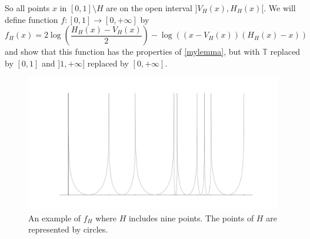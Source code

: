 \documentclass[a4paper,12pt,twoside,BCOR=10mm]{scrbook}
\theoremstyle{definition}
\theoremstyle{definition}
\theoremstyle{definition}
\begin{document}
So all points $x$ in $[0, 1] \setminus H$ are on the open interval $]V_H(x), H_H(x)[$.
We will define function $f: [0, 1] \rightarrow [0, +\infty]$ by
\[
\label{index29}
	f_H(x) = 2\log \left ( \frac{H_H(x) - V_H(x)}{2} \right ) - \log((x - V_H(x))(H_H(x) - x))
\]
and show that this function has the properties of \ref{mylemma}, but with $\mathbb{T}$ replaced by $[0, 1]$ and $]1, +\infty]$ replaced by $[0, +\infty]$.
\begin{figure}[h]
\centering
\includegraphics[width=1\textwidth]{graph8}
\caption{An example of $f_H$ where $H$ includes nine points. The points of $H$ are represented by circles. }
\end{figure}
\end{document}
